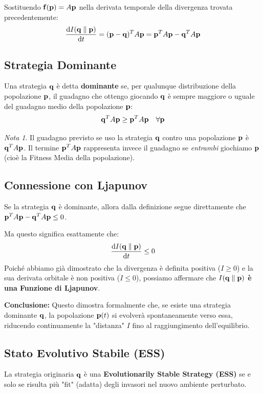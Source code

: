 \documentclass[openany]{book}
\theoremstyle{definition}
\theoremstyle{remark}
\newtheorem*{nota}{Nota}
\begin{document}
Sostituendo $\vb{f}(\vb{p}) = A\vb{p}$ nella derivata temporale della divergenza trovata precedentemente:
\begin{equation}
    \dv{I(\vb{q} \parallel \vb{p})}{t} = (\vb{p} - \vb{q})^T A\vb{p} = \vb{p}^T A\vb{p} - \vb{q}^T A\vb{p}
\end{equation}

\subsection*{Strategia Dominante}
Una strategia $\vb{q}$ è detta \textbf{dominante} se, per qualunque distribuzione della popolazione $\vb{p}$, il guadagno che ottengo giocando $\vb{q}$ è sempre maggiore o uguale del guadagno medio della popolazione $\vb{p}$:
\begin{equation}
    \vb{q}^T A\vb{p} \ge \vb{p}^T A\vb{p} \quad \forall \vb{p}
\end{equation}
\begin{nota}
Il guadagno previsto se uso la strategia $\vb{q}$ contro una popolazione $\vb{p}$ è $\vb{q}^T A\vb{p}$. Il termine $\vb{p}^T A\vb{p}$ rappresenta invece il guadagno se \textit{entrambi} giochiamo $\vb{p}$ (cioè la Fitness Media della popolazione).
\end{nota}

\subsection*{Connessione con Ljapunov}
Se la strategia $\vb{q}$ è dominante, allora dalla definizione segue direttamente che $\vb{p}^T A\vb{p} - \vb{q}^T A\vb{p} \le 0$. 

Ma questo significa esattamente che:
\begin{equation}
    \dv{I(\vb{q} \parallel \vb{p})}{t} \le 0
\end{equation}
Poiché abbiamo già dimostrato che la divergenza è definita positiva ($I \ge 0$) e la sua derivata orbitale è non positiva ($\dot{I} \le 0$), possiamo affermare che \textbf{$I(\vb{q} \parallel \vb{p})$ è una Funzione di Ljapunov}.

\textbf{Conclusione:} Questo dimostra formalmente che, se esiste una strategia dominante $\vb{q}$, la popolazione $\vb{p}(t)$ si evolverà spontaneamente verso essa, riducendo continuamente la "distanza" $I$ fino al raggiungimento dell'equilibrio.

\subsection*{Stato Evolutivo Stabile (ESS)}
La strategia originaria $\vb{q}$ è una \textbf{Evolutionarily Stable Strategy (ESS)} se e solo se risulta più "fit" (adatta) degli invasori nel nuovo ambiente perturbato.
\end{document}
